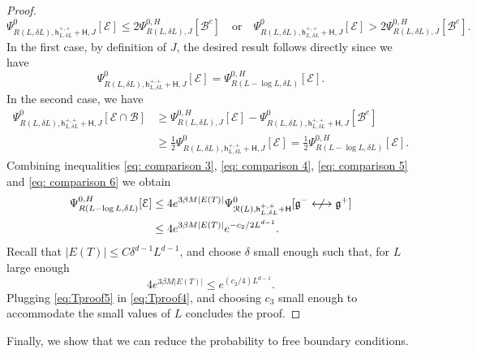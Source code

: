 \documentclass[11pt,a4paper]{article}
\theoremstyle{definition}
\numberwithin{equation}{section}
\newcommand\fg{\mathfrak{g}}
\begin{document}
\begin{proof}
\begin{equation}
\Psi^{0}_{R(L,\delta L),\mathsf{h}^{+,+}_{L,\delta L}+\mathsf{H},J}[\mathcal{E}]\leq 2 \Psi^{0,H}_{R(L,\delta L),J}[\mathcal{B}^c]    
\quad \text{or} \quad 
\Psi^{0}_{R(L,\delta L),\mathsf{h}^{+,+}_{L,\delta L}+\mathsf{H},J}[\mathcal{E}]> 2 \Psi^{0,H}_{R(L,\delta L),J}[\mathcal{B}^c].    
\end{equation}
In the first case, by definition of $J$, the desired result follows directly since we have 
\begin{equation}
\Psi^{0}_{R(L,\delta L),\mathsf{h}^{+,+}_{L,\delta L}+\mathsf{H},J}[\mathcal{E}]=\Psi^{0,H}_{R(L-\log L,\delta L)}[\mathcal{E}].
\end{equation}
In the second case, we have
\begin{equation}\label{eq: comparison 6}
\begin{aligned}
\Psi^{0}_{R(L,\delta L),\mathsf{h}^{+,+}_{L,\delta L}+\mathsf{H},J}[\mathcal{E} \cap \mathcal{B}]&\geq \Psi^{0,H}_{R(L,\delta L),J}[\mathcal{E}]-\Psi^{0}_{R(L,\delta L),\mathsf{h}^{+,+}_{L,\delta L}+\mathsf{H},J}[\mathcal{B}^c]\\&\geq \frac{1}{2}\Psi^{0}_{R(L,\delta L),\mathsf{h}^{+,+}_{L,\delta L}+\mathsf{H},J}[\mathcal{E}]=\frac{1}{2}\Psi^{0,H}_{R(L-\log L,\delta L)}[\mathcal{E}].
\end{aligned}
\end{equation}
Combining inequalities \eqref{eq: comparison 3}, \eqref{eq: comparison 4}, \eqref{eq: comparison 5} and \eqref{eq: comparison 6} we obtain 
\begin{align}
    \Psi^{0,H}_{R(L-\log L,\delta L)}[\mathcal{E}]&\leq 4e^{3\beta M |E(T)|} \Psi^{0}_{\mathcal{R}(L),\mathsf{h}^{+,+}_{L,\delta L}+\mathsf{H}}[\fg^{-}\centernot \longleftrightarrow \fg^{+}]
    \\&\leq 4e^{3\beta M |E(T)|} e^{-c_2/2L^{d-1}}.\label{eq:Tproof4}
\end{align} 
Recall that $|E(T)|\leq C\delta^{d-1}L^{d-1}$, and choose $\delta$ small enough such that, for $L$ large enough
\begin{equation}\label{eq:Tproof5}
    4e^{3\beta M |E(T)|} \leq e^{(c_2/4)L^{d-1}}.
\end{equation}
Plugging \eqref{eq:Tproof5} in \eqref{eq:Tproof4}, and choosing $c_3$ small enough to accommodate the small values of $L$ concludes the proof.
\end{proof}

Finally, we show that we can reduce the probability to free boundary conditions.
\end{document}
